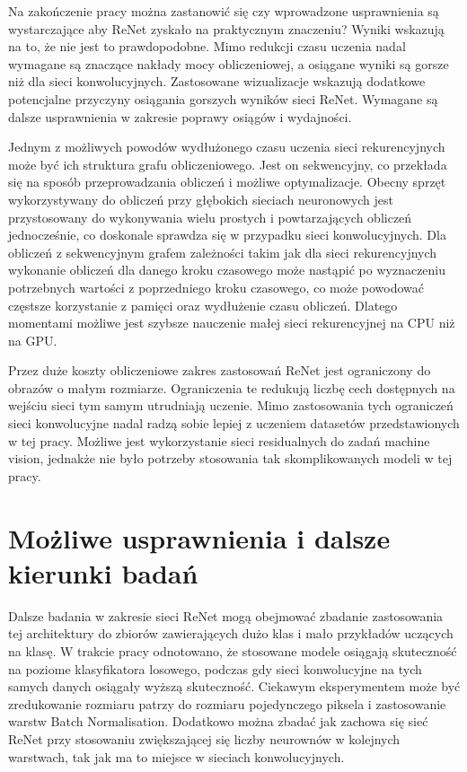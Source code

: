 \documentclass[oneside, mag]{mgr}
\begin{document}
Na zakończenie pracy można zastanowić się czy wprowadzone usprawnienia są wystarczające aby ReNet zyskało na praktycznym znaczeniu? Wyniki wskazują na to, że nie jest to prawdopodobne. Mimo redukcji czasu uczenia nadal wymagane są znaczące nakłady mocy obliczeniowej, a osiągane wyniki są gorsze niż dla sieci konwolucyjnych. Zastosowane wizualizacje wskazują dodatkowe potencjalne przyczyny osiągania gorszych wyników sieci ReNet. Wymagane są dalsze usprawnienia w zakresie poprawy osiągów i wydajności. 

Jednym z możliwych powodów wydłużonego czasu uczenia sieci rekurencyjnych może być ich struktura grafu obliczeniowego. Jest on sekwencyjny, co przekłada się na sposób przeprowadzania obliczeń i możliwe optymalizacje. Obecny sprzęt wykorzystywany do obliczeń przy głębokich sieciach neuronowych jest przystosowany do wykonywania wielu prostych i powtarzających obliczeń jednocześnie, co doskonale sprawdza się w przypadku sieci konwolucyjnych. Dla obliczeń z sekwencyjnym grafem zależności takim jak dla sieci rekurencyjnych wykonanie obliczeń dla danego kroku czasowego może nastąpić po wyznaczeniu potrzebnych wartości z poprzedniego kroku czasowego, co może powodować częstsze korzystanie z pamięci oraz wydłużenie czasu obliczeń. Dlatego momentami możliwe jest szybsze nauczenie małej sieci rekurencyjnej na CPU niż na GPU. 

Przez duże koszty obliczeniowe zakres zastosowań ReNet jest ograniczony do obrazów o małym rozmiarze. Ograniczenia te redukują liczbę cech dostępnych na wejściu sieci tym samym utrudniają uczenie. Mimo zastosowania tych ograniczeń sieci konwolucyjne nadal radzą sobie lepiej z uczeniem datasetów przedstawionych w tej pracy. Możliwe jest wykorzystanie sieci residualnych do zadań machine vision, jednakże nie było potrzeby stosowania tak skomplikowanych modeli w tej pracy.

\section{Możliwe usprawnienia i dalsze kierunki badań}

Dalsze badania w zakresie sieci ReNet mogą obejmować zbadanie zastosowania tej architektury do zbiorów zawierających dużo klas i mało przykładów uczących na klasę. W trakcie pracy odnotowano, że stosowane modele osiągają skuteczność na poziome klasyfikatora losowego, podczas gdy sieci konwolucyjne na tych samych danych osiągały wyższą skuteczność. Ciekawym eksperymentem może być zredukowanie rozmiaru patrzy do rozmiaru pojedynczego piksela i zastosowanie warstw Batch Normalisation. Dodatkowo można zbadać jak zachowa się sieć ReNet przy stosowaniu zwiększającej się liczby neurownów w kolejnych warstwach, tak jak ma to miejsce w sieciach konwolucyjnych.
\end{document}
